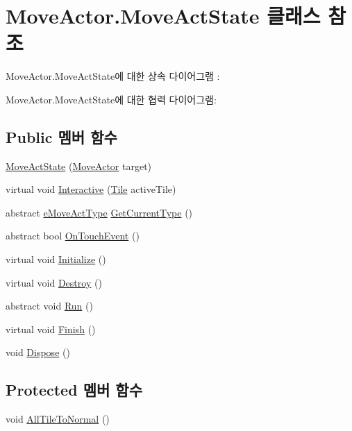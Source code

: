 \hypertarget{class_move_actor_1_1_move_act_state}{}\section{Move\+Actor.\+Move\+Act\+State 클래스 참조}
\label{class_move_actor_1_1_move_act_state}


Move\+Actor.\+Move\+Act\+State에 대한 상속 다이어그램 \+: 


Move\+Actor.\+Move\+Act\+State에 대한 협력 다이어그램\+:
\subsection*{Public 멤버 함수}
\begin{DoxyCompactItemize}
\item 
\hyperlink{class_move_actor_1_1_move_act_state_a3b5151984b49ac01bce197ec80e299b1}{Move\+Act\+State} (\hyperlink{class_move_actor}{Move\+Actor} target)
\item 
virtual void \hyperlink{class_move_actor_1_1_move_act_state_ae43bc38159d36bd83eaf172d946c0415}{Interactive} (\hyperlink{class_tile}{Tile} active\+Tile)
\item 
abstract \hyperlink{_move_actor_8cs_a1df5a2532cc7e6bde40a57d2dcbe23fe}{e\+Move\+Act\+Type} \hyperlink{class_move_actor_1_1_move_act_state_a21d1c989ddf24ff492600353ed8e7682}{Get\+Current\+Type} ()
\item 
abstract bool \hyperlink{class_move_actor_1_1_move_act_state_a5f459cc7bafbc01d915e5bdb01d9f715}{On\+Touch\+Event} ()
\item 
virtual void \hyperlink{class_f_z_1_1_state_a27ac6fd2e844476017b35aa781d73c8c}{Initialize} ()
\item 
virtual void \hyperlink{class_f_z_1_1_state_aa85fdf4a5495d6d5d3ed4aeda3497c8a}{Destroy} ()
\item 
abstract void \hyperlink{class_f_z_1_1_state_acaf1584680a2e69e2a4da20574723981}{Run} ()
\item 
virtual void \hyperlink{class_f_z_1_1_state_a288bb8c3fceee4bf03f01e295dcef1be}{Finish} ()
\item 
void \hyperlink{class_f_z_1_1_state_a598887d3fbb412fada132dc1c079b25b}{Dispose} ()
\end{DoxyCompactItemize}
\subsection*{Protected 멤버 함수}
\begin{DoxyCompactItemize}
\item 
void \hyperlink{class_move_actor_1_1_move_act_state_a8e1d5e7942d4f9de8c8e0732964c554b}{All\+Tile\+To\+Normal} ()
\end{DoxyCompactItemize}
